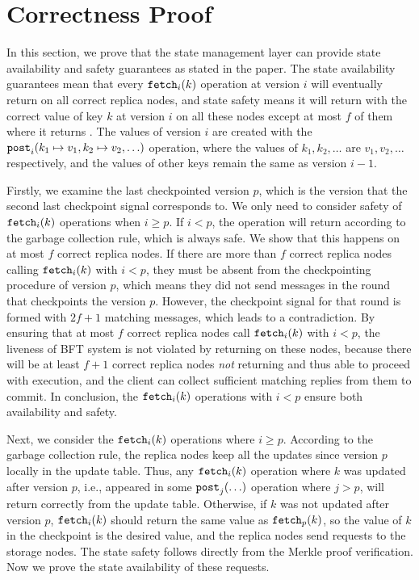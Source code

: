 \section{Correctness Proof}

In this section, we prove that the state management layer can provide state availability and safety guarantees as stated in the paper.
The state availability guarantees mean that every $\texttt{fetch}_{i}(k)$ operation at version $i$ will eventually return on all correct replica nodes, and state safety means it will return with the correct value of key $k$ at version $i$ on all these nodes except at most $f$ of them where it returns \forward.
The values of version $i$ are created with the $\texttt{post}_{i}(k_1 \mapsto v_1, k_2 \mapsto v_2, \ldots)$ operation, where the values of $k_1, k_2, \ldots$ are $v_1, v_2, \ldots$ respectively, and the values of other keys remain the same as version $i-1$.

Firstly, we examine the last checkpointed version $p$, which is the version that the second last checkpoint signal corresponds to.
We only need to consider safety of $\texttt{fetch}_{i}(k)$ operations when $i \geq p$.
If $i < p$, the operation will return \forward according to the garbage collection rule, which is always safe. 
We show that this happens on at most $f$ correct replica nodes.
If there are more than $f$ correct replica nodes calling $\texttt{fetch}_{i}(k)$ with $i < p$, they must be absent from the checkpointing procedure of version $p$, which means they did not send \votec messages in the round that checkpoints the version $p$.
However, the checkpoint signal for that round is formed with $2f+1$ matching \votec messages, which leads to a contradiction.
By ensuring that at most $f$ correct replica nodes call $\texttt{fetch}_{i}(k)$ with $i < p$, the liveness of BFT system is not violated by returning \forward on these nodes, because there will be at least $f+1$ correct replica nodes \emph{not} returning \forward and thus able to proceed with execution, and the client can collect sufficient matching replies from them to commit.
In conclusion, the $\texttt{fetch}_{i}(k)$ operations with $i < p$ ensure both availability and safety.

Next, we consider the $\texttt{fetch}_{i}(k)$ operations where $i \geq p$.
According to the garbage collection rule, the replica nodes keep all the updates since version $p$ locally in the update table.
Thus, any $\texttt{fetch}_{i}(k)$ operation where $k$ was updated after version $p$, i.e., appeared in some $\texttt{post}_{j}(\ldots)$ operation where $j > p$, will return correctly from the update table.
Otherwise, if $k$ was not updated after version $p$, $\texttt{fetch}_{i}(k)$ should return the same value as $\texttt{fetch}_{p}(k)$, so the value of $k$ in the checkpoint is the desired value, and the replica nodes send \retrieve requests to the storage nodes.
The state safety follows directly from the Merkle proof verification.
Now we prove the state availability of these \retrieve requests.

